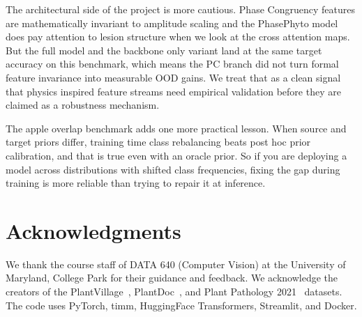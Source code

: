 \documentclass[conference]{IEEEtran}
\begin{document}
The architectural side of the project is more cautious. Phase Congruency features are mathematically invariant to amplitude scaling and the PhasePhyto model does pay attention to lesion structure when we look at the cross attention maps. But the full model and the backbone only variant land at the same target accuracy on this benchmark, which means the PC branch did not turn formal feature invariance into measurable OOD gains. We treat that as a clean signal that physics inspired feature streams need empirical validation before they are claimed as a robustness mechanism.

The apple overlap benchmark adds one more practical lesson. When source and target priors differ, training time class rebalancing beats post hoc prior calibration, and that is true even with an oracle prior. So if you are deploying a model across distributions with shifted class frequencies, fixing the gap during training is more reliable than trying to repair it at inference.

\section*{Acknowledgments}

We thank the course staff of DATA 640 (Computer Vision) at the University of Maryland, College Park for their guidance and feedback. We acknowledge the creators of the PlantVillage~\cite{Hughes2015}, PlantDoc~\cite{Singh2020}, and Plant Pathology 2021~\cite{Thapa2020} datasets. The code uses PyTorch, timm, HuggingFace Transformers, Streamlit, and Docker.



\end{document}
